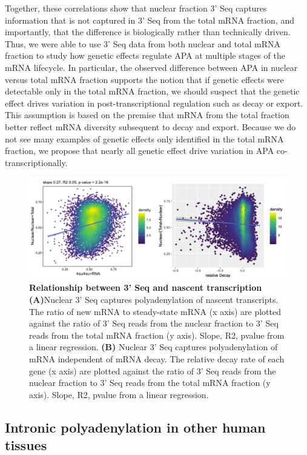 Together, these correlations show that nuclear fraction 3' Seq captures information that is not captured in 3' Seq from the total mRNA fraction, and importantly, that the difference is biologically rather than technically driven. Thus, we were able to use 3' Seq data from both nuclear and total mRNA fraction to study how genetic effects regulate APA at multiple stages of the mRNA lifecycle.  In particular, the observed difference between APA in nuclear versus total mRNA fraction supports the notion that if genetic effects were detectable only in the total mRNA fraction, we should suspect that the genetic effect drives variation in post-transcriptional regulation such as decay or export. This assumption is based on the premise that mRNA from the total fraction better reflect mRNA diversity subsequent to decay and export. Because we do not see many examples of genetic effects only identified in the total mRNA fraction, we propose that nearly all genetic effect drive variation in APA co-transcriptionally. 

\begin{figure}
\centering \includegraphics[width=5in]{img/ch02/figureAppendix1.pdf}
\caption[Relationship between 3' Seq and nascent transcription]{ \textbf{Relationship between 3' Seq and nascent transcription}  {\bf (A)}Nuclear 3' Seq captures polyadenylation of nascent transcripts. The ratio of new mRNA to steady-state mRNA (x axis) are plotted against the ratio of 3' Seq reads from the nuclear fraction to 3' Seq reads from the total mRNA fraction (y axis). Slope, R2, pvalue from a linear regression.  {\bf (B)} Nuclear 3' Seq captures polyadenylation of mRNA independent of mRNA decay. The relative decay rate of each gene (x axis) are plotted against the ratio of 3' Seq reads from the nuclear fraction to 3' Seq reads from the total mRNA fraction (y axis). Slope, R2, pvalue from a linear regression.}
\label{fig:Supplementaryfile1-Fig1}
\end{figure}


\subsection{Intronic polyadenylation in other human tissues}\label{ch02-intronic-other-tissues}

